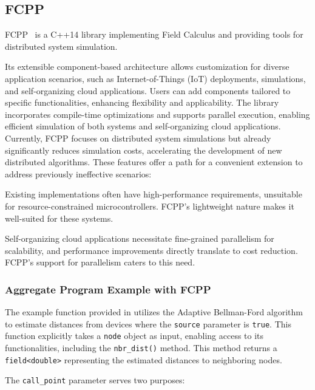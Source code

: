 

\subsection{FCPP}

FCPP~\cite{Audrito2020} is a C++14 library implementing Field Calculus and providing tools for distributed system simulation.

Its extensible component-based architecture allows customization for diverse application scenarios, such as Internet-of-Things (IoT) deployments, simulations, and self-organizing cloud applications. Users can add components tailored to specific functionalities, enhancing flexibility and applicability. The library incorporates compile-time optimizations and supports parallel execution, enabling efficient simulation of both systems and self-organizing cloud applications. Currently, FCPP focuses on distributed system simulations but already significantly reduces simulation costs, accelerating the development of new distributed algorithms. These features offer a path for a convenient extension to address previously ineffective scenarios:

Existing implementations often have high-performance requirements, unsuitable for resource-constrained microcontrollers. FCPP's lightweight nature makes it well-suited for these systems.

Self-organizing cloud applications necessitate fine-grained parallelism for scalability, and performance improvements directly translate to cost reduction. FCPP's support for parallelism caters to this need.

\subsubsection{Aggregate Program Example with FCPP}

The example function provided in  utilizes the Adaptive Bellman-Ford algorithm to estimate distances from devices where the \texttt{source} parameter is \texttt{true}. This function explicitly takes a \texttt{node} object as input, enabling access to its functionalities, including the \texttt{nbr\_dist()} method. This method returns a \texttt{field<double>} representing the estimated distances to neighboring nodes.

The \texttt{call\_point} parameter serves two purposes:

